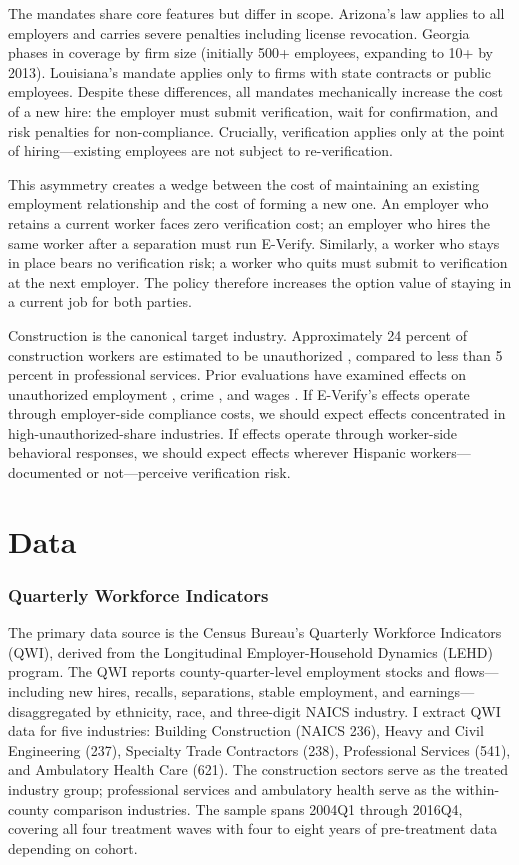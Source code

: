 \documentclass[12pt]{article}
\begin{document}
The mandates share core features but differ in scope. Arizona's law applies to all employers and carries severe penalties including license revocation. Georgia phases in coverage by firm size (initially 500+ employees, expanding to 10+ by 2013). Louisiana's mandate applies only to firms with state contracts or public employees. Despite these differences, all mandates mechanically increase the cost of a new hire: the employer must submit verification, wait for confirmation, and risk penalties for non-compliance. Crucially, verification applies only at the point of hiring---existing employees are not subject to re-verification.

This asymmetry creates a wedge between the cost of maintaining an existing employment relationship and the cost of forming a new one. An employer who retains a current worker faces zero verification cost; an employer who hires the same worker after a separation must run E-Verify. Similarly, a worker who stays in place bears no verification risk; a worker who quits must submit to verification at the next employer. The policy therefore increases the option value of staying in a current job for both parties.

Construction is the canonical target industry. Approximately 24 percent of construction workers are estimated to be unauthorized \citep{passel2016size}, compared to less than 5 percent in professional services. Prior evaluations have examined effects on unauthorized employment \citep{bohn2014did}, crime \citep{lofstrom2013effects}, and wages \citep{card2012immigration, peri2012effect}. If E-Verify's effects operate through employer-side compliance costs, we should expect effects concentrated in high-unauthorized-share industries. If effects operate through worker-side behavioral responses, we should expect effects wherever Hispanic workers---documented or not---perceive verification risk.

\section{Data}
\label{sec:data}

\subsubsection*{Quarterly Workforce Indicators} The primary data source is the Census Bureau's Quarterly Workforce Indicators (QWI), derived from the Longitudinal Employer-Household Dynamics (LEHD) program. The QWI reports county-quarter-level employment stocks and flows---including new hires, recalls, separations, stable employment, and earnings---disaggregated by ethnicity, race, and three-digit NAICS industry. I extract QWI data for five industries: Building Construction (NAICS 236), Heavy and Civil Engineering (237), Specialty Trade Contractors (238), Professional Services (541), and Ambulatory Health Care (621). The construction sectors serve as the treated industry group; professional services and ambulatory health serve as the within-county comparison industries. The sample spans 2004Q1 through 2016Q4, covering all four treatment waves with four to eight years of pre-treatment data depending on cohort.
\end{document}
